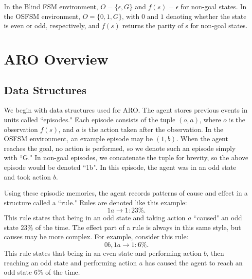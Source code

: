 \documentclass[letterpaper]{article} %
\begin{document}
In the Blind FSM environment, $O = \{\epsilon, G\}$ and $f(s) = \epsilon$ for non-goal states. In the OSFSM environment, $O = \{0, 1, G\}$, with $0$ and $1$ denoting whether the state is even or odd, respectively, and $f(s)$ returns the parity of s for non-goal states.

\section{ARO Overview}


\subsection{Data Structures}

We begin with data structures used for ARO. The agent stores previous events in units called ``episodes." Each episode consists of the tuple $(o, a)$, where $o$ is the observation $f(s)$, and $a$ is the action taken after the observation. In the OSFSM environment, an example episode may be $(1,b)$. When the agent reaches the goal, no action is performed, so we denote such an episode simply with ``G." In non-goal episodes, we concatenate the tuple for brevity, so the above episode would be denoted ``1b". In this episode, the agent was in an odd state and took action $b$.

Using these episodic memories, the agent records patterns of cause and effect in a structure called a ``rule." Rules are denoted like this example: $$1a \rightarrow 1: 23\%.$$ This rule states that being in an odd state and taking action $a$ ``caused" an odd state $23\%$ of the time. The effect part of a rule is always in this same style, but causes may be more complex. For example, consider this rule: $$0b,1a \rightarrow 1: 6\%.$$ 
This rule states that being in an even state and performing action $b$, then reaching an odd state and performing action $a$ has caused the agent to reach an odd state $6\%$ of the time.
\end{document}
